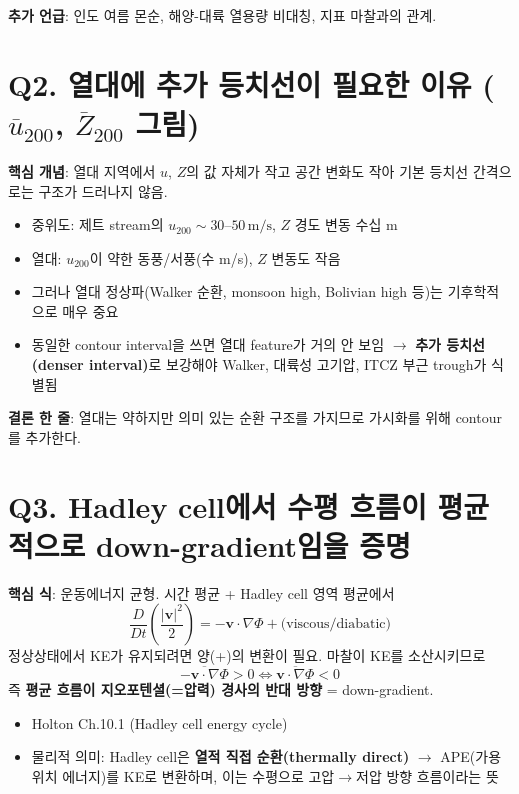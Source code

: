 \documentclass[11pt,a4paper]{article}
\begin{document}
\textbf{추가 언급}: 인도 여름 몬순, 해양-대륙 열용량 비대칭, 지표 마찰과의 관계.

\section*{Q2. 열대에 추가 등치선이 필요한 이유 ($\overline{u}_{200}$, $\overline{Z}_{200}$ 그림)}

\textbf{핵심 개념}: 열대 지역에서 $u$, $Z$의 값 자체가 작고 공간 변화도 작아 기본 등치선 간격으로는 구조가 드러나지 않음.
\begin{itemize}
    \item 중위도: 제트 stream의 $u_{200} \sim 30$--$50\,\mathrm{m/s}$, $Z$ 경도 변동 수십 m
    \item 열대: $u_{200}$이 약한 동풍/서풍(수 m/s), $Z$ 변동도 작음
    \item 그러나 열대 정상파(Walker 순환, monsoon high, Bolivian high 등)는 기후학적으로 매우 중요
    \item 동일한 contour interval을 쓰면 열대 feature가 거의 안 보임 $\to$ \textbf{추가 등치선(denser interval)}로 보강해야 Walker, 대륙성 고기압, ITCZ 부근 trough가 식별됨
\end{itemize}

\textbf{결론 한 줄}: 열대는 약하지만 의미 있는 순환 구조를 가지므로 가시화를 위해 contour를 추가한다.

\section*{Q3. Hadley cell에서 수평 흐름이 평균적으로 down-gradient임을 증명}

\textbf{핵심 식}: 운동에너지 균형. 시간 평균 + Hadley cell 영역 평균에서
$$\frac{D}{Dt}\left(\frac{|\mathbf{v}|^2}{2}\right) = -\mathbf{v}\cdot \nabla\Phi + \text{(viscous/diabatic)}$$
정상상태에서 KE가 유지되려면 양(+)의 변환이 필요. 마찰이 KE를 소산시키므로
$$\overline{-\mathbf{v}\cdot\nabla\Phi} > 0 \iff \overline{\mathbf{v}\cdot\nabla\Phi} < 0$$
즉 \textbf{평균 흐름이 지오포텐셜(=압력) 경사의 반대 방향} = down-gradient.

\begin{itemize}
    \item Holton Ch.10.1 (Hadley cell energy cycle)
    \item 물리적 의미: Hadley cell은 \textbf{열적 직접 순환(thermally direct)} $\to$ APE(가용 위치 에너지)를 KE로 변환하며, 이는 수평으로 고압$\to$저압 방향 흐름이라는 뜻
\end{itemize}
\end{document}

